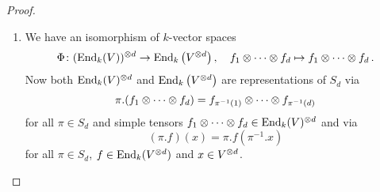 \begin{proof}
  \leavevmode
  \begin{enumerate}
    \item
      We have an isomorphism of $k$-vector spaces
      \begin{align*}
                \Phi
        \colon  (\operatorname{End}_k(V))^{\mathbin{\otimes} d}
        \to     \operatorname{End}_k\left( V^{\mathbin{\otimes} d} \right),
        \quad   f_1 \mathbin{\otimes} \dotsb \mathbin{\otimes} f_d
        \mapsto f_1 \mathbin{\otimes} \dotsb \mathbin{\otimes} f_d \,.
      \end{align*}
      Now both $\operatorname{End}_k(V)^{\mathbin{\otimes} d}$ and $\operatorname{End}_k\left( V^{\mathbin{\otimes} d} \right)$ are representations of $S_d$ via
      \[
          \pi.(f_1 \mathbin{\otimes} \dotsb \mathbin{\otimes} f_d)
        = f_{\pi^{-1}(1)} \mathbin{\otimes} \dotsb \mathbin{\otimes} f_{\pi^{-1}(d)}
      \]
      for all $\pi \in S_d$ and simple tensors $f_1 \mathbin{\otimes} \dotsb \mathbin{\otimes} f_d \in \operatorname{End}_k(V)^{\mathbin{\otimes} d}$ and via
      \[
          (\pi.f)(x)
        = \pi.f\left( \pi^{-1}.x \right)
      \]
      for all $\pi \in S_d$, $f \in \operatorname{End}_k(V^{\mathbin{\otimes} d})$ and $x \in V^{\mathbin{\otimes} d}$.
      

\end{enumerate}
\end{proof}
